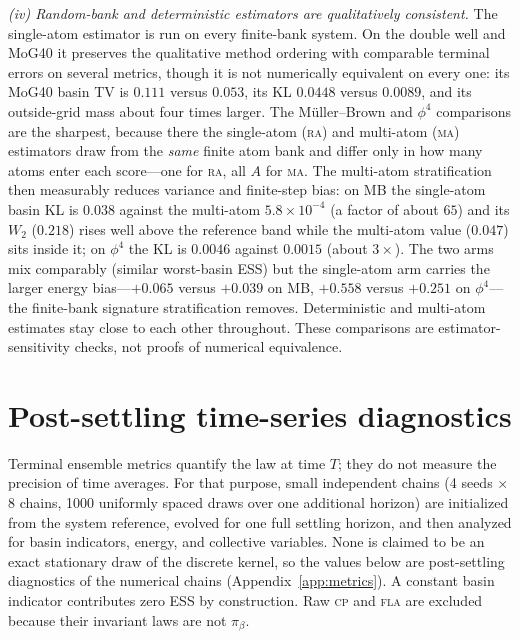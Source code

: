 \documentclass[11pt]{article}
\newcommand{\piB}{\pi_\beta}
\begin{document}
\emph{(iv) Random-bank and deterministic estimators are qualitatively
consistent.}
The single-atom estimator is run on every finite-bank system.  On the double
well and MoG40 it preserves the qualitative method ordering with comparable
terminal errors on several metrics, though it is not numerically equivalent on
every one: its MoG40 basin TV is $0.111$ versus $0.053$, its KL $0.0448$ versus
$0.0089$, and its outside-grid mass about four times larger.  The
M\"uller--Brown and $\phi^4$ comparisons are the sharpest, because there the
single-atom (\textsc{ra}) and multi-atom (\textsc{ma}) estimators draw from the
\emph{same} finite atom bank and differ only in how many atoms enter each
score---one for \textsc{ra}, all $A$ for \textsc{ma}.  The multi-atom
stratification then measurably reduces variance and finite-step bias: on MB the
single-atom basin KL is $0.038$ against the multi-atom $5.8\times10^{-4}$ (a
factor of about $65$) and its $W_2$ ($0.218$) rises well above the reference
band while the multi-atom value ($0.047$) sits inside it; on $\phi^4$ the KL is
$0.0046$ against $0.0015$ (about $3\times$).  The two arms mix comparably
(similar worst-basin ESS) but the single-atom arm carries the larger energy
bias---$+0.065$ versus $+0.039$ on MB, $+0.558$ versus $+0.251$ on
$\phi^4$---the finite-bank signature stratification removes.  Deterministic and
multi-atom estimates stay close to each other throughout.  These comparisons
are estimator-sensitivity checks, not proofs of numerical equivalence.

\section{Post-settling time-series diagnostics}
\label{sec:efficiency}

Terminal ensemble metrics quantify the law at time $T$; they do not measure
the precision of time averages.  For that purpose, small independent chains
(4 seeds $\times$ 8 chains, 1000 uniformly spaced draws over one additional
horizon) are initialized from the system reference, evolved for one full
settling horizon, and then analyzed for basin indicators, energy, and
collective variables.  None is claimed to be an exact stationary draw of the
discrete kernel, so the values below are post-settling diagnostics of the
numerical chains (Appendix~\ref{app:metrics}).  A constant basin indicator
contributes zero ESS by construction.  Raw \textsc{cp} and \textsc{fla} are
excluded because their invariant laws are not $\piB$.
\end{document}
